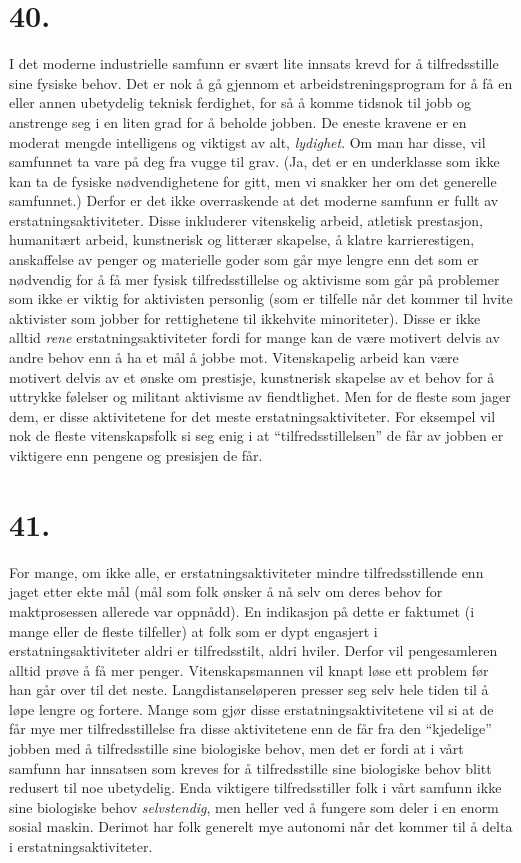 \documentclass[oneside]{book}
\begin{document}
\section*{40.}
I det moderne industrielle samfunn er svært lite innsats krevd for å
tilfredsstille sine fysiske behov. Det er nok å gå gjennom et
arbeidstreningsprogram for å få en eller annen ubetydelig teknisk ferdighet,
for så å komme tidsnok til jobb og anstrenge seg i en liten grad for å beholde
jobben. De eneste kravene er en moderat mengde intelligens og viktigst av alt,
{\em lydighet}. Om man har disse, vil samfunnet ta vare på deg fra vugge til
grav. (Ja, det er en underklasse som ikke kan ta de fysiske nødvendighetene for
gitt, men vi snakker her om det generelle samfunnet.) Derfor er det ikke
overraskende at det moderne samfunn er fullt av erstatningsaktiviteter. Disse
inkluderer vitenskelig arbeid, atletisk prestasjon, humanitært arbeid,
kunstnerisk og litterær skapelse, å klatre karrierestigen, anskaffelse av
penger og materielle goder som går mye lengre enn det som er nødvendig for å få
mer fysisk tilfredsstillelse og aktivisme som går på problemer som ikke er
viktig for aktivisten personlig (som er tilfelle når det kommer til hvite
aktivister som jobber for rettighetene til ikkehvite minoriteter). Disse er
ikke alltid \emph{rene} erstatningsaktiviteter fordi for mange kan de være
motivert delvis av andre behov enn å ha et mål å jobbe mot. Vitenskapelig
arbeid kan være motivert delvis av et ønske om prestisje, kunstnerisk skapelse
av et behov for å uttrykke følelser og militant aktivisme av fiendtlighet. Men
for de fleste som jager dem, er disse aktivitetene for det meste
erstatningsaktiviteter. For eksempel vil nok de fleste vitenskapsfolk si seg
enig i at ``tilfredsstillelsen'' de får av jobben er viktigere enn pengene og
presisjen de får.

\section*{41.}
For mange, om ikke alle, er erstatningsaktiviteter mindre tilfredsstillende enn
jaget etter ekte mål (mål som folk ønsker å nå selv om deres behov for
maktprosessen allerede var oppnådd). En indikasjon på dette er faktumet (i
mange eller de fleste tilfeller) at folk som er dypt engasjert i
erstatningsaktiviteter aldri er tilfredsstilt, aldri hviler. Derfor vil
pengesamleren alltid prøve å få mer penger. Vitenskapsmannen vil knapt løse ett
problem før han går over til det neste. Langdistanseløperen presser seg selv
hele tiden til å løpe lengre og fortere. Mange som gjør disse
erstatningsaktivitetene vil si at de får mye mer tilfredsstillelse fra disse
aktivitetene enn de får fra den ``kjedelige'' jobben med å tilfredsstille sine
biologiske behov, men det er fordi at i vårt samfunn har innsatsen som kreves
for å tilfredsstille sine biologiske behov blitt redusert til noe ubetydelig.
Enda viktigere tilfredsstiller folk i vårt samfunn ikke sine biologiske behov
{\em selvstendig}, men heller ved å fungere som deler i en enorm sosial maskin.
Derimot har folk generelt mye autonomi når det kommer til å delta i
erstatningsaktiviteter.
\end{document}
